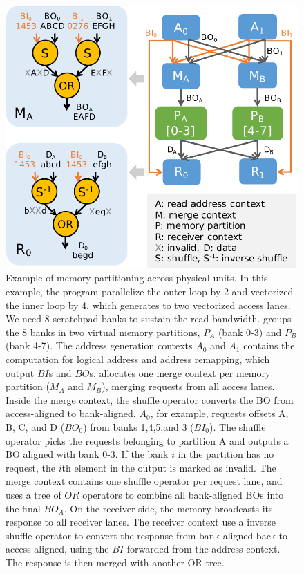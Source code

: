\begin{figure}
  \centering
  \includegraphics[width=0.6\columnwidth]{figs/memsplit2.pdf}
  \caption[Memory partitioning]{Example of memory partitioning across physical units. In this
  example, the program parallelize the outer loop by 2 and vectorized the inner loop by 4, which
  generates to two vectorized access lanes. We need 8 scratchpad banks to sustain the read bandwidth. 
  \name groups the 8 banks in two virtual memory partitions, $P_A$ (bank 0-3) and $P_B$ (bank 4-7). The
  address generation contexts $A_0$ and $A_1$ contains the computation for logical address and address
  remapping, which output $BI$s and $BO$s. \name allocates one merge context per memory partition
  ($M_A$ and $M_B$),
  merging requests from all access lanes. Inside the merge context, the shuffle operator converts
  the BO from access-aligned to bank-aligned. $A_0$, for example, requests offsets 
  A, B, C, and D ($BO_0$) from banks 1,4,5,and 3 ($BI_0$). The shuffle operator picks the requests
  belonging to partition A and outputs a BO aligned with bank 0-3. If the bank $i$ in the partition has no
  request, the $i$th element in the output is marked as invalid.
  The merge context contains one shuffle operator per request lane, and uses a tree of $OR$
  operators to combine all bank-aligned BOs into the final $BO_A$.
  On the receiver side, the memory broadcasts its response to all receiver lanes.
  The receiver context use a inverse shuffle operator to convert the response from bank-aligned back to
  access-aligned, using the $BI$ forwarded from the address context. The response is then merged
  with another OR tree. 
  }
  \label{fig:memsplit}
\end{figure}

